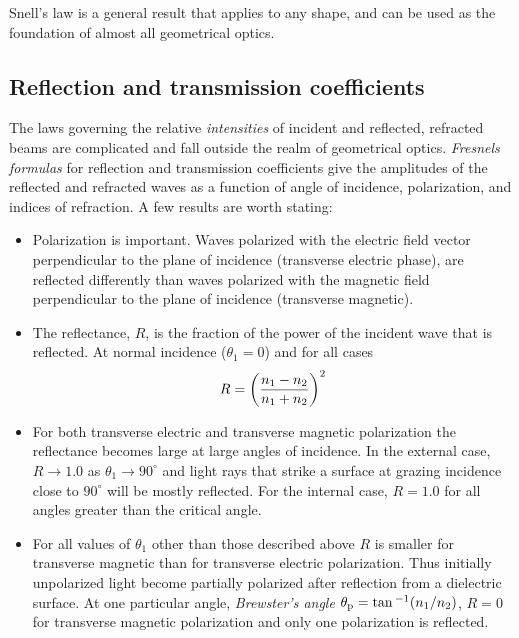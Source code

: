 Snell's law is a general result that applies to any shape, and can be used as the foundation of 
almost all geometrical optics.

\subsection{Reflection and transmission coefficients}

The laws governing the relative {\it intensities} of incident and
reflected, refracted beams are complicated and fall outside the realm
of geometrical optics. {\it Fresnels formulas} for reflection and
transmission coefficients give the amplitudes of the reflected and
refracted waves as a function of angle of incidence, polarization, and
indices of refraction. A few results are worth stating:
\begin{itemize}
\item Polarization is important. Waves polarized with the electric
  field vector perpendicular to the plane of incidence (transverse
  electric phase), are reflected differently than waves polarized with
  the magnetic field perpendicular to the plane of incidence
  (transverse magnetic).
\item The reflectance, $R$, is the fraction of the power of the
  incident wave that is reflected. At normal incidence ($\theta_1=0$)
  and for all cases \[ R=\left({n_1-n_2\over n_1+n_2}\right)^2 \]
\item For both transverse electric and transverse magnetic
  polarization the reflectance becomes large at large angles of
  incidence. In the external case, $R\rightarrow 1.0$ as
  $\theta_1\rightarrow 90^{\circ}$ and light rays that strike a
  surface at grazing incidence close to $90^{\circ}$ will be mostly
  reflected. For the internal case, $R=1.0$ for all angles greater
  than the critical angle.
\item For all values of $\theta_1$ other than those described above
  $R$ is smaller for transverse magnetic than for transverse electric
  polarization. Thus initially unpolarized light become partially
  polarized after reflection from a dielectric surface. At one
  particular angle, {\it Brewster's angle} $\theta_{\rm
    p}=\tan{^{-1}({n_1/n_2})}$, $R=0$ for transverse magnetic
  polarization and only one polarization is reflected.
\end{itemize}

